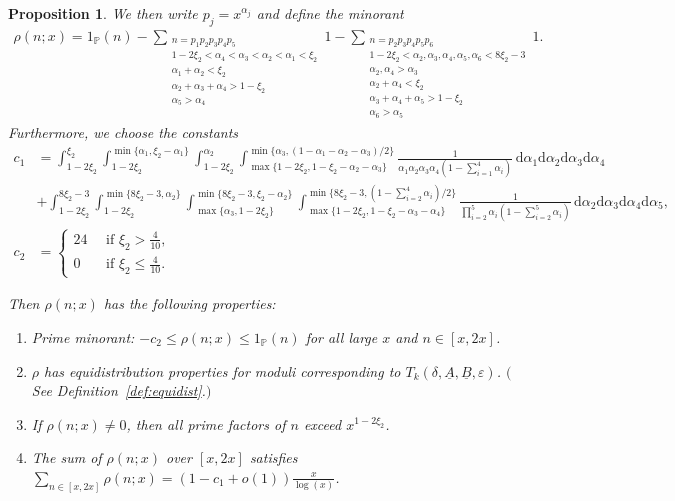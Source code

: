 \documentclass{amsart}
\newtheorem{prop}{Proposition}
\numberwithin{equation}{section}
\begin{document}
\begin{prop}
We then  write $p_j = x^{\alpha_j}$ and define the minorant 
\begin{align*}
\rho(n;x) = 1_{\mathbb{P}}(n) - \sum_{\substack{ n = p_1p_2p_3p_4p_5 \\ 1 -2\xi_2 < \alpha_4 < \alpha_3 < \alpha_2 < \alpha_1 < \xi_2 \\ \alpha_1+\alpha_2 < \xi_2 \\ \alpha_2+\alpha_3+\alpha_4 >1-\xi_2 \\ \alpha_5>\alpha_4}} 1- \sum_{\substack{ n = p_2p_3p_4p_5p_6 \\ 1-2\xi_2 < \alpha_2, \alpha_3, \alpha_4, \alpha_5, \alpha_6 < 8\xi_2-3    \\ \alpha_2, \alpha_4 > \alpha_3  \\ \alpha_2+\alpha_4 < \xi_2\\ \alpha_3 + \alpha_4 + \alpha_5 >1-\xi_2 \\   \alpha_6 > \alpha_5 }} 1.
\end{align*}
Furthermore, we choose the constants
\begin{align*}
 c_1&=  \int^{\xi_2}_{1 -2\xi_2}\int^{\min\{\alpha_1, \xi_2-\alpha_1\}}_{1 -2\xi_2}\int^{\alpha_2}_{1 -2\xi_2}\int^{\min\{\alpha_3,(1-\alpha_1-\alpha_2-\alpha_3)/2\}}_{\max\{1 -2\xi_2, 1 - \xi_2-\alpha_2-\alpha_3\}} \frac{1}{\alpha_1\alpha_2\alpha_3\alpha_4(1-\sum_{i=1}^4\alpha_i)} \, \mbox{d}\alpha_1 \mbox{d}\alpha_2\mbox{d}\alpha_3\mbox{d}\alpha_4 \\
&+
 \int^{8\xi_2-3 }_{1 -2\xi_2}\int^{\min\{8\xi_2-3 , \alpha_2\}}_{1 -2\xi_2}\!\!\!\!\int_{\max\{\alpha_3, 1 -2\xi_2\}}^{\min\{8\xi_2-3 , \xi_2-\alpha_2\}}\!\!\!\!\int^{\min\{8\xi_2-3 ,(1-\sum_{i=2}^4\alpha_i)/2\}}_{\max\{1 -2\xi_2,1 - \xi_2-\alpha_3-\alpha_4\}} \frac{1}{\prod_{i=2}^5\alpha_i(1-\sum_{i=2}^5\alpha_i)} \, \mbox{d}\alpha_2 \mbox{d}\alpha_3\mbox{d}\alpha_4\mbox{d}\alpha_5,\\
 c_2 &=  \begin{cases} 
 24 \quad \mbox{ if } \xi_2 > \frac{4}{10}, \\ 
 0  \,\,\, \quad \mbox{ if } \xi_2 \leq  \frac{4}{10}.
 \end{cases}
\end{align*} 
 
Then $\rho(n;x)$ has the following properties:
\begin{enumerate}[{\rm(1)}]
\item  Prime minorant: $-c_2 \leq \rho(n;x) \leq 1_{\mathbb{P}}(n)$ for all large $x$ and $n \in [x,2x]$.  
\item  $\rho$ has  equidistribution properties for  moduli corresponding to $T_k(\delta,\underline{A},\underline{B},\varepsilon)$. $($See Definition~\ref{def:equidist}.$)$
\item If $\rho(n;x) \neq 0$, then all prime factors of $n$ exceed $x^{1-2\xi_2}$.  
\item The sum of $\rho(n;x)$ over $[x,2x]$ satisfies
$\sum_{n \in [x,2x]} \rho(n;x) = (1-c_1 +o(1)) \frac{x}{\log(x)}$.
\end{enumerate}
\end{prop}
\end{document}
